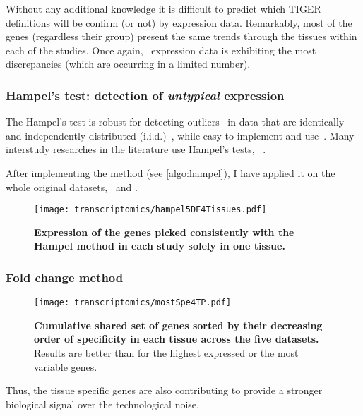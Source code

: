 Without any additional knowledge it is difficult to predict which \gls{TIGER}
definitions will be confirm (or not) by expression data.
Remarkably, most of the genes (regardless their group) present the same trends
through the tissues within each of the studies.
Once again, \castle\ expression data is exhibiting the most discrepancies
(which are occurring in a limited number).


\subsubsection{Hampel's test: detection of \emph{untypical} expression}\label{subsub:Hampel}

The Hampel's test is robust for detecting outliers~
in data that are identically and independently distributed (i.i.d.)~,
while easy to implement and use~.
Many interstudy researches in the literature use Hampel's tests,
\eg~.

After implementing the method (see \cref{algo:hampel}),
I have applied it on the whole original datasets, \setOne\ and \setTwo.

\begin{figure}[!htpb]
    \texttt{[image: transcriptomics/hampel5DF4Tissues.pdf]}\centering
    \caption[Expression of the genes picked with Hampel method]{\label{fig:hampelExp}%
    \textbf{Expression of the genes picked consistently with the Hampel method
    in each study solely in one tissue.}}
\end{figure}


\subsubsection{Fold change method}\label{subsub:TisSpeGeneMethodPerso}

\begin{figure}[!htpb]
    \texttt{[image: transcriptomics/mostSpe4TP.pdf]}\centering
    \caption[Cumulative shared set of genes sorted by their specificity in each
    tissue across the 5 datasets]{\label{fig:mostSpe4T}\textbf{Cumulative shared
    set of genes sorted by their decreasing order of specificity in each tissue
    across the five datasets.} Results are better than for the highest expressed or
    the most variable genes.}
\end{figure}

Thus, the tissue specific genes are also contributing to provide a stronger
biological signal over the technological noise.

